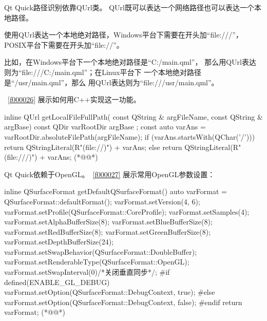 Qt Quick路径识别依靠QUrl类。
QUrl既可以表达一个网络路径也可以表达一个本地路径。

使用QUrl表达一个本地绝对路径，Windows平台下需要在开头加“file:///”，
POSIX平台下需要在开头加“file://”。

比如，在Windows平台下一个本地绝对路径是“C:/main.qml”，
那么用QUrl表达则为“file:///C:/main.qml”；在Linux平台下
一个本地绝对路径是“/usr/main.qml”，那么
用QUrl表达则为“file:///usr/main.qml”。

\lstlistingname\ \ref{f000026}
展示如何用C{\sourcefonttwo{}+}{\sourcefonttwo{}+}实现这一功能。

\FloatBarrier
\begin{thebookfilesourceone}[escapeinside={(*@}{@*)},
label=f000026,
caption=GoodLuck,
title=\lstlistingname \thelstlisting
,firstnumber=6]
inline QUrl getLocalFileFullPath(
    const QString & argFileName,
    const QString & argBase) {
    const QDir varRootDir{ argBase };
    const auto varAns = varRootDir.absoluteFilePath(argFileName);
    if (varAns.startsWith(QChar('/'))) {
        return QStringLiteral(R"(file://)") + varAns;
    } else {
        return QStringLiteral(R"(file:///)") + varAns;
    }
}(*@\marginpar[\hfill\setlength\fboxsep{2pt}\fbox{\footnotesize{\kaishu\parbox{1em}{\setlength{\baselineskip}{2pt}\lstlistingname}}\footnotesize{\thelstlisting}}]{\setlength\fboxsep{2pt}\fbox{\footnotesize{\kaishu\parbox{1em}{\setlength{\baselineskip}{2pt}\lstlistingname}}\footnotesize{\thelstlisting}}}@*)\end{thebookfilesourceone}          %

Qt Quick依赖于OpenGL。\lstlistingname\ \ref{f000027}
展示常用OpenGL参数设置：

\FloatBarrier
\begin{thebookfilesourceone}[escapeinside={(*@}{@*)},
label=f000027,
caption=GoodLuck,
title=\lstlistingname \thelstlisting
,firstnumber=18]
inline QSurfaceFormat getDefaultQSurfaceFormat() {
    auto varFormat = QSurfaceFormat::defaultFormat();
    varFormat.setVersion(4, 6);
    varFormat.setProfile(QSurfaceFormat::CoreProfile);
    varFormat.setSamples(4);
    varFormat.setAlphaBufferSize(8);
    varFormat.setBlueBufferSize(8);
    varFormat.setRedBufferSize(8);
    varFormat.setGreenBufferSize(8);
    varFormat.setDepthBufferSize(24);
    varFormat.setSwapBehavior(QSurfaceFormat::DoubleBuffer);
    varFormat.setRenderableType(QSurfaceFormat::OpenGL);
    varFormat.setSwapInterval(0)/*关闭垂直同步*/;
#if defined(ENABLE_GL_DEBUG)
    varFormat.setOption(QSurfaceFormat::DebugContext, true);
#else
    varFormat.setOption(QSurfaceFormat::DebugContext, false);
#endif
    return varFormat;
}(*@\marginpar[\hfill\setlength\fboxsep{2pt}\fbox{\footnotesize{\kaishu\parbox{1em}{\setlength{\baselineskip}{2pt}\lstlistingname}}\footnotesize{\thelstlisting}}]{\setlength\fboxsep{2pt}\fbox{\footnotesize{\kaishu\parbox{1em}{\setlength{\baselineskip}{2pt}\lstlistingname}}\footnotesize{\thelstlisting}}}@*)\end{thebookfilesourceone}          %


